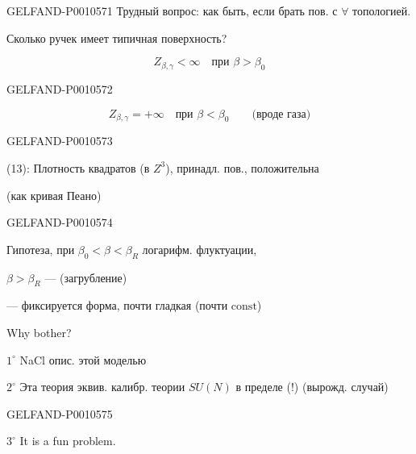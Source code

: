 \begin{GelfandAdjacentEvidence}{GELFAND-P001057}{1}
Трудный вопрос: как быть, если брать пов. с \(\forall\) топологией.

Сколько ручек имеет типичная поверхность?

\begin{equation*}
Z_{\beta,\gamma}<\infty\quad\text{при }\beta>\beta_0
\tag{12}
\end{equation*}
\end{GelfandAdjacentEvidence}
\begin{GelfandAdjacentEvidence}{GELFAND-P001057}{2}


\begin{equation*}
Z_{\beta,\gamma}=+\infty\quad\text{при }\beta<\beta_0
  \qquad\text{(вроде газа)}
\tag{13}
\end{equation*}
\end{GelfandAdjacentEvidence}
\begin{GelfandAdjacentEvidence}{GELFAND-P001057}{3}


(13): Плотность квадратов (в \(Z^3\)), принадл. пов., положительна

(как кривая Пеано)
\end{GelfandAdjacentEvidence}
\begin{GelfandAdjacentEvidence}{GELFAND-P001057}{4}


Гипотеза, при \(\beta_0<\beta<\beta_R\) логарифм. флуктуации,

\(\beta>\beta_R\) —  (загрубление)

— фиксируется форма, почти гладкая (почти \(\mathrm{const}\))

Why bother?

\(1^\circ\) NaCl опис. этой моделью

\(2^\circ\) Эта теория эквив. калибр. теории \(SU(N)\) в пределе  (!) (вырожд. случай)
\end{GelfandAdjacentEvidence}
\begin{GelfandAdjacentEvidence}{GELFAND-P001057}{5}


\(3^\circ\) It is a fun problem.
\end{GelfandAdjacentEvidence}
